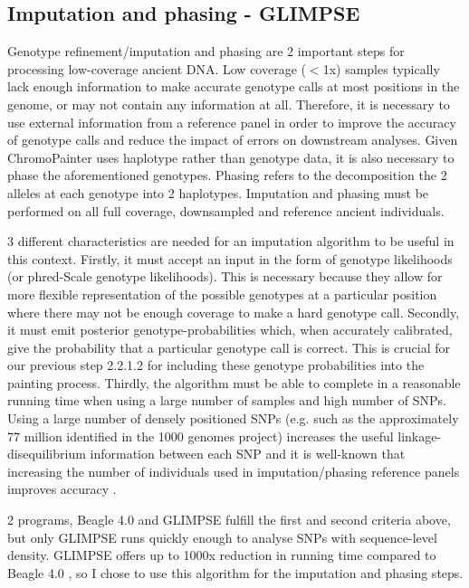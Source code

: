 \subsection{Imputation and phasing - GLIMPSE}

Genotype refinement/imputation and phasing are 2 important steps for processing low-coverage ancient DNA. Low coverage ($<$1x) samples typically lack enough information to make accurate genotype calls at most positions in the genome, or may not contain any information at all. Therefore, it is necessary to use external information from a reference panel in order to improve the accuracy of genotype calls and reduce the impact of errors on downstream analyses. Given ChromoPainter uses haplotype rather than genotype data, it is also necessary to phase the aforementioned genotypes. Phasing refers to the decomposition the 2 alleles at each genotype into 2 haplotypes. Imputation and phasing must be performed on all full coverage, downsampled and reference ancient individuals. 

3 different characteristics are needed for an imputation algorithm to be useful in this context. Firstly, it must accept an input in the form of genotype likelihoods (or phred-Scale genotype likelihoods). This is necessary because they allow for more flexible representation of the possible genotypes at a particular position where there may not be enough coverage to make a hard genotype call. Secondly, it must emit posterior genotype-probabilities which, when accurately calibrated, give the probability that a particular genotype call is correct. This is crucial for our previous step 2.2.1.2 for including these genotype probabilities into the painting process. Thirdly, the algorithm must be able to complete in a reasonable running time when using a large number of samples and high number of SNPs. Using a large number of densely positioned SNPs (e.g. such as the approximately 77 million identified in the 1000 genomes project) increases the useful linkage-disequilibrium information between each SNP and it is well-known that increasing the number of individuals used in imputation/phasing reference panels improves accuracy \cite{delaneau2018integrative, HUANG2009235, mccarthy2016reference, rubinacci2021efficient}. 

2 programs, Beagle 4.0 \cite{Browning2007} and GLIMPSE \cite{rubinacci2021efficient} fulfill the first and second criteria above, but only GLIMPSE runs quickly enough to analyse SNPs with sequence-level density. GLIMPSE offers up to 1000x reduction in running time compared to Beagle 4.0 \cite{rubinacci2021efficient}, so I chose to use this algorithm for the imputation and phasing steps.   

